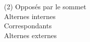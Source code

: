 %
%
    \begin{tasks}(2)
        \task Opposés par le sommet\\
        \task Alternes internes\\
        \task Correspondants\\
        \task Alternes externes\\
    \end{tasks}
    \pagebreak
